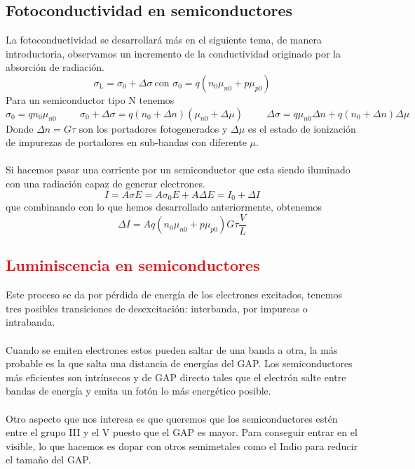 \subsection{Fotoconductividad en semiconductores} \label{sec: fotoconductividad en semiconductores}
La fotoconductividad se desarrollará más en el siguiente tema, de manera introductoria, observamos un incremento de la conductividad originado por la absorción de radiación.
\begin{equation}
    \sigma_\mathrm{L}=\sigma_0 +\Delta \sigma \ \text{con } \sigma_0=q(n_0\mu_{n0}+p\mu_{p0})
\end{equation}
Para un semiconductor tipo N tenemos
\begin{equation*}
    \sigma_0=q n_0 \mu_{n0} \hspace{1cm} \sigma_0+ \Delta \sigma=q (n_0+\Delta n) (\mu_{n0}+\Delta \mu) \hspace{1cm} \Delta \sigma= q \mu_{n0} \Delta n+ q (n_0+\Delta n)\Delta \mu
\end{equation*}
Donde $\Delta n= G\tau $ son los portadores fotogenerados y $\Delta \mu $ es el estado de ionización de impurezas de portadores en sub-bandas con diferente $\mu$.\\\\
Si hacemos pasar una corriente por un semiconductor que esta siendo iluminado con una radiación capaz de generar electrones. $$I=A\sigma E= A\sigma_0 E+ A\Delta E=I_0+\Delta I$$ que combinando con lo que hemos desarrollado anteriormente, obtenemos $$\Delta I=Aq(n_0\mu_{n0}+p\mu_{p0}) G \tau \frac{V}{L}$$ 
\subsection{\textcolor{red}{Luminiscencia en semiconductores}} \label{sec: luminiscencia en semiconductores}
Este proceso se da por pérdida de energía de los electrones excitados, tenemos tres posibles transiciones de desexcitación: interbanda, por impureas o intrabanda.\\\\
Cuando se emiten electrones estos pueden saltar de una banda a otra, la más probable es la que salta una distancia de energías del GAP. Los semiconductores  más eficientes son intrínsecos y de GAP directo tales que el electrón salte entre bandas de energía y emita un fotón lo más energético posible.\\\\
Otro aspecto que nos interesa es que queremos que los semiconductores estén entre el grupo III y el V puesto que el GAP es mayor. Para conseguir entrar en el visible, lo que hacemos es dopar con otros semimetales como el Indio para reducir el tamaño del GAP.
